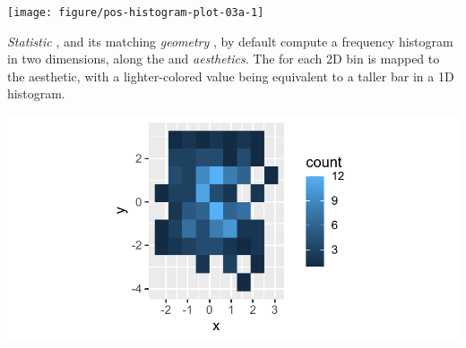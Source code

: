 \documentclass[krantz2]{krantz}\usepackage{knitr}
\begin{document}
\begin{knitrout}\footnotesize
{}\color{fgcolor}\begin{kframe}
\begin{alltt}
 \hlopt{+} 
\end{alltt}
\end{kframe}

{\centering \texttt{[image: figure/pos-histogram-plot-03a-1]} 

}


\end{knitrout}

\emph{Statistic} , and its matching \emph{geometry} , by default compute a frequency histogram in two dimensions, along the  and  \emph{aesthetics}. The  for each 2D bin is mapped to the  aesthetic, with a lighter-colored value being equivalent to a taller bar in a 1D histogram.



\begin{knitrout}\footnotesize
{}\color{fgcolor}\begin{kframe}
\begin{alltt}
 \hlkwb{<-}
  \hlstd{(} 
          \hlstd{=} \hlstd{(}    \hlopt{+}
  \hlstd{(} \hlstd{=} 
\end{alltt}
\end{kframe}
\end{knitrout}

\begin{knitrout}\footnotesize
{}\color{fgcolor}\begin{kframe}
\begin{alltt}
 \hlopt{+} \hlstd{(} \hlstd{=} \hlstd{)}
\end{alltt}
\end{kframe}

{\centering \includegraphics[width=.7\textwidth]{figure/pos-bin2d-plot-01-1} 

}


\end{knitrout}
\end{document}
